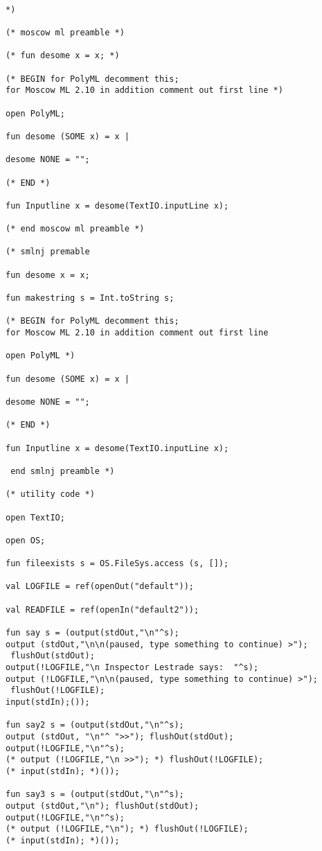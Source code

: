 \documentclass[12pt]{article}
\begin{document}
\begin{verbatim}

*)

(* moscow ml preamble *)

(* fun desome x = x; *)

(* BEGIN for PolyML decomment this; 
for Moscow ML 2.10 in addition comment out first line *)

open PolyML;

fun desome (SOME x) = x |

desome NONE = "";

(* END *)

fun Inputline x = desome(TextIO.inputLine x);

(* end moscow ml preamble *)

(* smlnj premable 

fun desome x = x;

fun makestring s = Int.toString s;

(* BEGIN for PolyML decomment this; 
for Moscow ML 2.10 in addition comment out first line

open PolyML *)

fun desome (SOME x) = x |

desome NONE = "";

(* END *)

fun Inputline x = desome(TextIO.inputLine x);

 end smlnj preamble *)

(* utility code *)

open TextIO;

open OS;

fun fileexists s = OS.FileSys.access (s, []);

val LOGFILE = ref(openOut("default"));

val READFILE = ref(openIn("default2"));

fun say s = (output(stdOut,"\n"^s);
output (stdOut,"\n\n(paused, type something to continue) >");
 flushOut(stdOut);
output(!LOGFILE,"\n Inspector Lestrade says:  "^s);
output (!LOGFILE,"\n\n(paused, type something to continue) >");
 flushOut(!LOGFILE);
input(stdIn);());

fun say2 s = (output(stdOut,"\n"^s);
output (stdOut, "\n"^ ">>"); flushOut(stdOut);
output(!LOGFILE,"\n"^s);
(* output (!LOGFILE,"\n >>"); *) flushOut(!LOGFILE);
(* input(stdIn); *)());

fun say3 s = (output(stdOut,"\n"^s);
output (stdOut,"\n"); flushOut(stdOut);
output(!LOGFILE,"\n"^s);
(* output (!LOGFILE,"\n"); *) flushOut(!LOGFILE);
(* input(stdIn); *)());


\end{verbatim}
\end{document}
